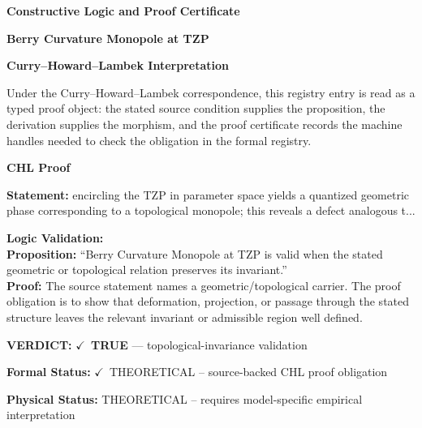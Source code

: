\clearpage
\begingroup\tzpsupportsetup
\noindent\textbf{\fontsize{10.8pt}{12.8pt}\selectfont [ID 0165] Constructive Logic and Proof Certificate}\par
\noindent\textbf{\fontsize{10pt}{12pt}\selectfont Berry Curvature Monopole at TZP}\par
\vspace{0.45em}
\begingroup
\footnotesize
\setlength{\parskip}{0.22em}
\setlength{\parindent}{0pt}
\noindent\textbf{Curry--Howard--Lambek Interpretation}\par
Under the Curry--Howard--Lambek correspondence, this registry entry is read as a typed proof
object: the stated source condition supplies the proposition, the derivation supplies the
morphism, and the proof certificate records the machine handles needed to check the obligation
in the formal registry.

\vspace{0.45em}
\noindent\textbf{CHL Proof}\par
\textbf{Statement:} encircling the TZP in parameter space yields a quantized geometric phase corresponding
to a topological monopole; this reveals a defect analogous t...

\textbf{Logic Validation:}\\
\textbf{Proposition:} ``Berry Curvature Monopole at TZP is valid when the stated geometric or topological
relation preserves its invariant.''\\
\textbf{Proof:} The source statement names a geometric/topological carrier. The proof obligation is to
show that deformation, projection, or passage through the stated structure leaves the
relevant invariant or admissible region well defined.

\textbf{VERDICT:} \ensuremath{\checkmark}\ \textbf{TRUE} --- topological-invariance validation

\textbf{Formal Status:} \ensuremath{\checkmark}\ THEORETICAL -- source-backed CHL proof obligation

\textbf{Physical Status:} THEORETICAL -- requires model-specific empirical interpretation
\par\vspace{0.45em}
\par
\ifTZPDarkEdition
{}
\fi
\endgroup
\endgroup
